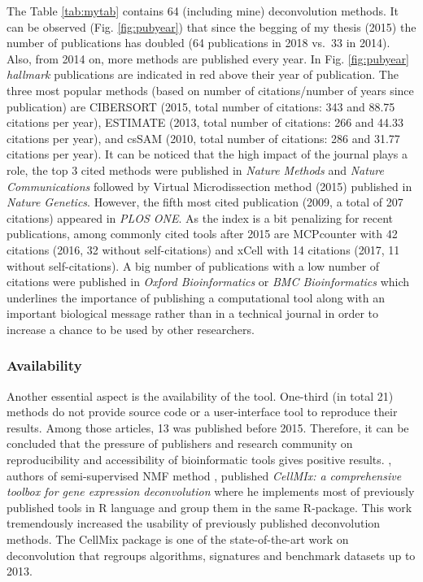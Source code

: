 \documentclass[12pt,]{book}
\theoremstyle{definition}
\theoremstyle{definition}
\theoremstyle{definition}
\theoremstyle{remark}
\begin{document}
The Table \ref{tab:mytab} contains 64 (including mine) deconvolution
methods. It can be observed (Fig. \ref{fig:pubyear}) that since the
begging of my thesis (2015) the number of publications has doubled (64
publications in 2018 vs.~33 in 2014). Also, from 2014 on, more methods
are published every year. In Fig. \ref{fig:pubyear} \emph{hallmark}
publications are indicated in red above their year of publication. The
three most popular methods (based on number of citations/number of years
since publication) are CIBERSORT \citep{Newman2015} (2015, total number
of citations: 343 and 88.75 citations per year), ESTIMATE
\citep{Yoshihara2013} (2013, total number of citations: 266 and 44.33
citations per year), and csSAM \citep{ShenOrr2010} (2010, total number
of citations: 286 and 31.77 citations per year). It can be noticed that
the high impact of the journal plays a role, the top 3 cited methods
were published in \emph{Nature Methods} and \emph{Nature Communications}
followed by Virtual Microdissection method \citep{Moffitt2015} (2015)
published in \emph{Nature Genetics}. However, the fifth most cited
publication \citet{Abbas2009} (2009, a total of 207 citations) appeared
in \emph{PLOS ONE}. As the index is a bit penalizing for recent
publications, among commonly cited tools after 2015 are MCPcounter with
42 citations (2016, 32 without self-citations) and xCell with 14
citations (2017, 11 without self-citations). A big number of
publications with a low number of citations were published in
\emph{Oxford Bioinformatics} or \emph{BMC Bioinformatics} which
underlines the importance of publishing a computational tool along with
an important biological message rather than in a technical journal in
order to increase a chance to be used by other researchers.

\hypertarget{availability}{%
\subsubsection{Availability}\label{availability}}

Another essential aspect is the availability of the tool. One-third (in
total 21) methods do not provide source code or a user-interface tool to
reproduce their results. Among those articles, 13 was published before
2015. Therefore, it can be concluded that the pressure of publishers and
research community on reproducibility and accessibility of bioinformatic
tools gives positive results. \citet{Shen-Orr2013}, authors of
semi-supervised NMF method \citep{Gaujoux2012}, published \emph{CellMIx:
a comprehensive toolbox for gene expression deconvolution} where he
implements most of previously published tools in R language and group
them in the same R-package. This work tremendously increased the
usability of previously published deconvolution methods. The CellMix
package is one of the state-of-the-art work on deconvolution that
regroups algorithms, signatures and benchmark datasets up to 2013.
\end{document}
